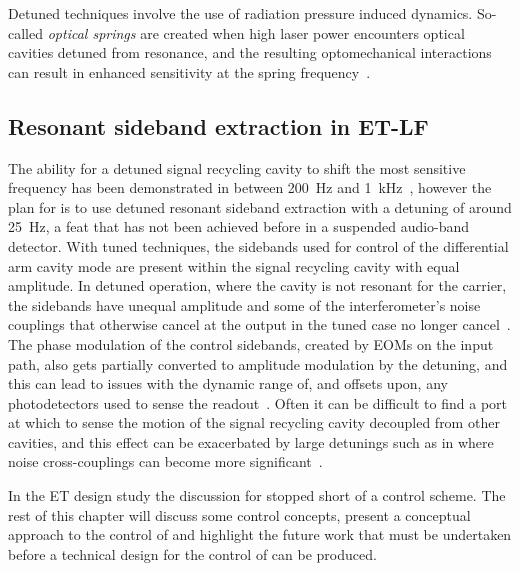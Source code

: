 Detuned techniques involve the use of radiation pressure induced dynamics. So-called \emph{optical springs} are created when high laser power encounters optical cavities detuned from resonance, and the resulting optomechanical interactions can result in enhanced sensitivity at the spring frequency~\cite{Buonanno2002}.

\subsection{Resonant sideband extraction in ET-LF}
The ability for a detuned signal recycling cavity to shift the most sensitive frequency has been demonstrated in \GEO{} between \SI{200}{\hertz} and \SI{1}{\kilo\hertz}~\cite{Hild2006}, however the plan for \ETLF{} is to use detuned resonant sideband extraction with a detuning of around \SI{25}{\hertz}, a feat that has not been achieved before in a suspended audio-band detector. With tuned techniques, the sidebands used for control of the differential arm cavity mode are present within the signal recycling cavity with equal amplitude. In detuned operation, where the cavity is not resonant for the carrier, the sidebands have unequal amplitude and some of the interferometer's noise couplings that otherwise cancel at the output in the tuned case no longer cancel~\cite{Hild2007}. The phase modulation of the control sidebands, created by \glspl{EOM} on the input path, also gets partially converted to amplitude modulation by the detuning, and this can lead to issues with the dynamic range of, and offsets upon, any photodetectors used to sense the readout~\cite{Grote2007}. Often it can be difficult to find a port at which to sense the motion of the signal recycling cavity decoupled from other cavities, and this effect can be exacerbated by large detunings such as in \ETLF{} where noise cross-couplings can become more significant~\cite{Hild2007}.

In the \gls{ET} design study the discussion for \ETLF{} stopped short of a control scheme. The rest of this chapter will discuss some control concepts, present a conceptual approach to the control of \ETLF{} and highlight the future work that must be undertaken before a technical design for the control of \ETLF{} can be produced.

